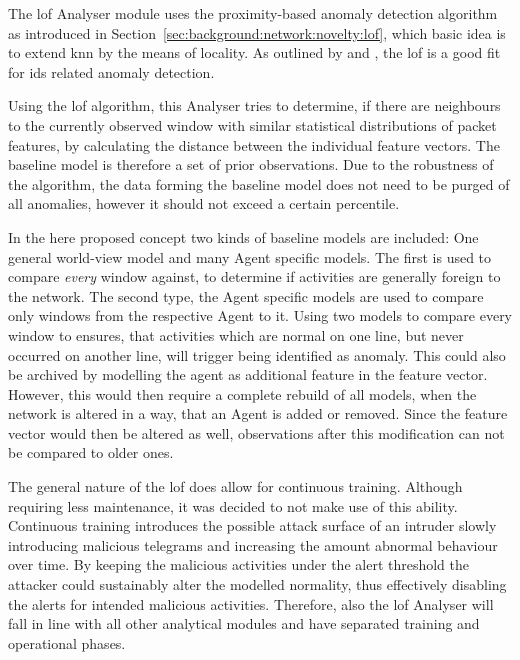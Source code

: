 The \gls{lof} Analyser module uses the proximity-based anomaly detection algorithm as introduced in Section~\ref{sec:background:network:novelty:lof}, which basic idea is to extend \gls{knn} by the means of locality.
As outlined by \textcite{Lazarevic2003} and \textcite{Zanero2004}, the \gls{lof} is a good fit for \gls{ids} related anomaly detection.

Using the \gls{lof} algorithm, this Analyser tries to determine, if there are neighbours to the currently observed window with similar statistical distributions of packet features, by calculating the distance between the individual feature vectors.
The baseline model is therefore a set of prior observations.
Due to the robustness of the algorithm, the data forming the baseline model does not need to be purged of all anomalies, however it should not exceed a certain percentile.

In the here proposed concept two kinds of baseline models are included: One general world-view model and many Agent specific models. 
The first is used to compare \emph{every} window against, to determine if activities are generally foreign to the network.
The second type, the Agent specific models are used to compare only windows from the respective Agent to it.
Using two models to compare every window to ensures, that activities which are normal on one line, but never occurred on another line, will trigger being identified as anomaly. 
This could also be archived by modelling the agent as additional feature in the feature vector.
However, this would then require a complete rebuild of all models, when the network is altered in a way, that an Agent is added or removed. Since the feature vector would then be altered as well, observations after this modification can not be compared to older ones.

The general nature of the \gls{lof} does allow for continuous training. Although requiring less maintenance, it was decided to not make use of this ability. Continuous training introduces the possible attack surface of an intruder slowly introducing malicious telegrams and increasing the amount abnormal behaviour over time. By keeping the malicious activities under the alert threshold the attacker could sustainably alter the modelled normality, thus effectively disabling the alerts for intended malicious activities.
Therefore, also the \gls{lof} Analyser will fall in line with all other analytical modules and have separated training and operational phases.

